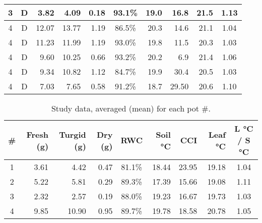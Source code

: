 \documentclass{report}
\begin{document}
\begin{table}[h]
\begin{tabular}{cc||r|r|r|c|r|r|r|c}
    3            & D             & 3.82               & 4.09                & 0.18             & 93.1\%            & 19.0                     & 16.8         & 21.5                     & 1.13         \\ \hline
    4            & D             & 12.07              & 13.77               & 1.19             & 86.5\%            & 20.3                     & 14.6         & 21.1                     & 1.04         \\ \hline
    4            & D             & 11.23              & 11.99               & 1.19             & 93.0\%            & 19.8                     & 11.5         & 20.3                     & 1.03         \\ \hline
    4            & D             & 9.60               & 10.25               & 0.66             & 93.2\%            & 20.2                     & 6.9          & 21.4                     & 1.06         \\ \hline
    4            & D             & 9.34               & 10.82               & 1.12             & 84.7\%            & 19.9                     & 30.4         & 20.5                     & 1.03         \\ \hline
    4            & D             & 7.03               & 7.65                & 0.58             & 91.2\%            & 18.7                     & 29.50        & 20.6                     & 1.10         \\
    \end{tabular}
\end{table}

\vspace{1cm}

\begin{table}[h]
    \caption{Study data, averaged (mean) for each pot \#.}
    \begin{tabular}{c||r|r|r|c|r|r|r|c}
        \textbf{\#} & \textbf{Fresh (g)} & \textbf{Turgid (g)} & \textbf{Dry (g)} & \textbf{RWC} & \textbf{Soil °C} & \textbf{CCI} & \textbf{Leaf °C} & \textbf{L °C / S °C} \\ \hline
        1           & 3.61               & 4.42                & 0.47             & 81.1\%            & 18.44            & 23.95        & 19.18            & 1.04                 \\ \hline
        2           & 5.22               & 5.81                & 0.29             & 89.3\%            & 17.39            & 15.66        & 19.08            & 1.11                 \\ \hline
        3           & 2.32               & 2.57                & 0.19             & 88.0\%            & 19.23            & 16.67        & 19.73            & 1.03                 \\ \hline
        4           & 9.85               & 10.90               & 0.95             & 89.7\%            & 19.78            & 18.58        & 20.78            & 1.05                 \\
    \end{tabular}
\end{table}
\end{document}
